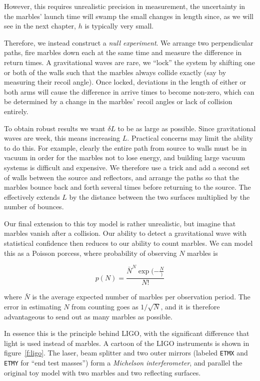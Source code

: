 However, this requires unrealistic precision in measurement, the
uncertainty in the marbles' launch time will swamp the small changes in 
length since, as we will see in the next chapter, $h$ is typically
very small.

Therefore, we instead construct a \emph{null experiment}.  We arrange
two perpendicular paths, fire marbles down each at the same time and
measure the difference in return times.  A gravitational waves are
rare, we ``lock'' the system by shifting one or both of the walls such
that the marbles always collide exactly (say by measuring their recoil
angle).  Once locked, deviations in the length of either or both arms
will cause the difference in arrive times to become non-zero, which
can be determined by a change in the marbles' recoil angles or lack of
collision entirely.

To obtain robust results we want $\delta L$ to be as large as
possible.  Since gravitational waves are week, this means increasing
$L$.  Practical concerns may limit the ability to do this.  For
example, clearly the entire path from source to walls must be in
vacuum in order for the marbles not to lose energy, and building large
vacuum systems is difficult and expensive.  We therefore use a trick
and add a second set of walls between the source and reflectors, and
arrange the paths so that the marbles bounce back and forth several
times before returning to the source.  The effectively extends $L$ by
the distance between the two surfaces multiplied by the number of
bounces.

Our final extension to this toy model is rather unrealistic, but
imagine that marbles vanish after a collision.  Our ability to detect a
gravitational wave with statistical confidence then reduces to our
ability to count marbles.  We can model this as a Poisson porcess, where
probability of observing $N$ marbles is 

\begin{equation*}
p(N) = \frac{\bar{N}^N \exp(-\frac{N})} {N!}
\end{equation*}

where $\bar{N}$ is the average expected number of marbles per
observation period.  The error in estimating $N$ from counting goes as
$1/\sqrt{N}$, and it is therefore advantageous to send out as many 
marbles as possible.

In essence this is the principle behind LIGO, with the significant
difference that light is used instead of marbles.  A cartoon 
of the LIGO instruments is shown in figure~\ref{f:ligo}.  The laser,
beam splitter and two outer mirrors (labeled \texttt{ETMX} and
\texttt{ETMY} for ``end test masses'') form a \emph{Michelson
interferometer}, and parallel the original toy model with two marbles 
and two reflecting surfaces.


